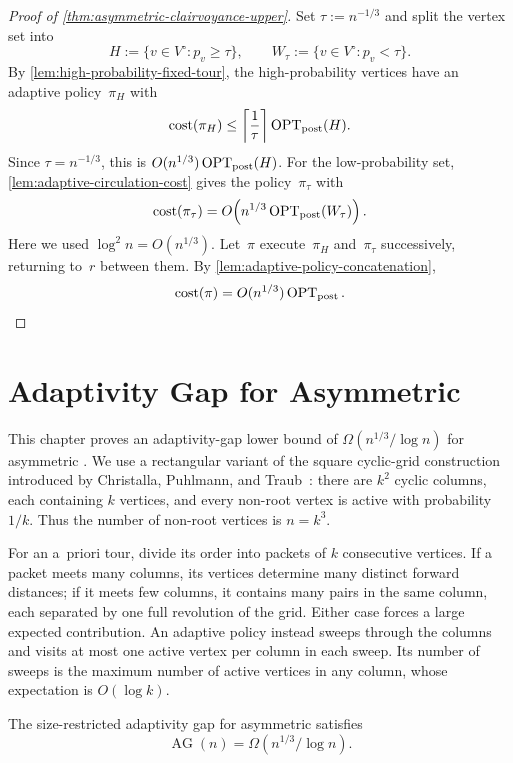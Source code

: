 \documentclass[12pt,a4paper,oneside]{report}
\begin{document}
\begin{proof}[Proof of \cref{thm:asymmetric-clairvoyance-upper}]
Set $\tau:=n^{-1/3}$ and split the vertex set into
\[
    H:=\{v\in V^\circ:p_v\ge\tau\},
    \qquad
    W_\tau:=\{v\in V^\circ:p_v<\tau\}.
\]
By \cref{lem:high-probability-fixed-tour}, the high-probability vertices have
an adaptive policy~$\pi_H$ with
\[
    \operatorname{cost}(\pi_H)
    \le \left\lceil\frac1\tau\right\rceil\operatorname{OPT}_\mathrm{post}(H).
\]
Since $\tau=n^{-1/3}$, this is $O(n^{1/3})\operatorname{OPT}_\mathrm{post}(H)$.
For the low-probability set, \cref{lem:adaptive-circulation-cost} gives
the policy~$\pi_\tau$ with
\[
    \operatorname{cost}(\pi_\tau)
    =O\!\left(n^{1/3}\operatorname{OPT}_\mathrm{post}(W_\tau)\right).
\]
Here we used $\log^2 n=O(n^{1/3})$.
Let~$\pi$ execute~$\pi_H$ and~$\pi_\tau$ successively, returning to~$r$
between them.  By \cref{lem:adaptive-policy-concatenation},
\[
    \operatorname{cost}(\pi)=O(n^{1/3})\operatorname{OPT}_\mathrm{post}.
\]
\end{proof}


\chapter{Adaptivity Gap for Asymmetric \StochTSP{}}\label{ch:asym-adapt}

This chapter proves an adaptivity-gap lower bound of
$\Omega(n^{1/3}/\log n)$ for asymmetric \StochTSP{}.  We use a rectangular
variant of the square cyclic-grid construction introduced by Christalla, Puhlmann,
and Traub~\cite[Section~3.1]{Christalla2025}: there are $k^2$ cyclic columns,
each containing $k$ vertices, and every non-root vertex is active with
probability~$1/k$.  Thus the number of non-root vertices is $n=k^3$.

For an a~priori tour, divide its order into packets of $k$ consecutive
vertices.  If a packet meets many columns, its vertices determine many
distinct forward distances; if it meets few columns, it contains many pairs
in the same column, each separated by one full revolution of the grid.  Either
case forces a large expected contribution.  An adaptive policy instead
sweeps through the columns and visits at most one active vertex per column in
each sweep.  Its number of sweeps is the maximum number of active vertices in
any column, whose expectation is $O(\log k)$.

\begin{theorem}
\label{thm:asymmetric-adaptivity-lower}
The size-restricted adaptivity gap for asymmetric \StochTSP{} satisfies
\[
    \operatorname{AG}(n)=\Omega(n^{1/3}/\log n).
\]
\end{theorem}
\end{document}
